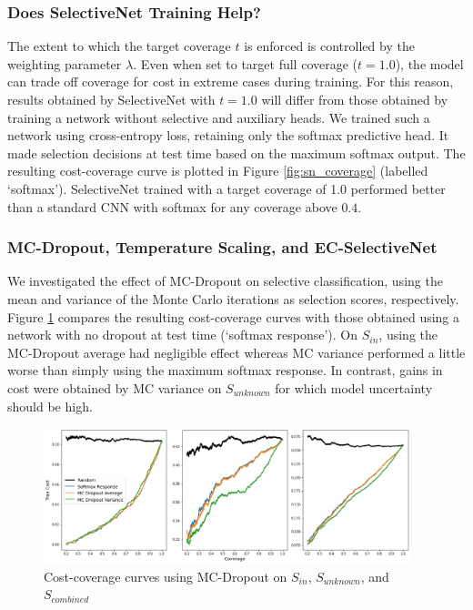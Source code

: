 \subsubsection{Does SelectiveNet Training Help?}
The extent to which the target coverage $t$ is enforced is controlled by the weighting parameter $\lambda$. Even when set to target full coverage ($t=1.0$), the model can trade off coverage for cost in extreme cases during training. For this reason, results obtained by SelectiveNet with $t=1.0$ will differ from those obtained by training a network without selective and auxiliary heads. We trained such a network using cross-entropy loss, retaining only the softmax predictive head. It made selection decisions at test time based on the maximum softmax output. The resulting cost-coverage curve is plotted in Figure \ref{fig:sn_coverage} (labelled `softmax'). SelectiveNet trained with a target coverage of 1.0 performed better than a standard CNN with softmax for any coverage above $0.4$.

\subsubsection{MC-Dropout, Temperature Scaling, and EC-SelectiveNet}
We investigated the effect of MC-Dropout on selective classification, using the mean and variance of the Monte Carlo iterations as selection scores, respectively. Figure \ref{fig:mc_dropout} compares the resulting cost-coverage curves with those obtained using a network with no dropout at test time (`softmax response'). On $S_{in}$, using the MC-Dropout average had negligible effect whereas MC variance performed a little worse than simply using the maximum softmax response. In contrast, gains in cost were obtained by MC variance on $S_{unknown}$ for which model uncertainty should be high.
   
\begin{figure}[h]
	\centering
	\includegraphics[width=0.95\textwidth]{images/mc_dropout_v2.png}
	\caption{Cost-coverage curves using MC-Dropout on $S_{in}$, $S_{unknown}$, and $S_{combined}$}
	\label{fig:mc_dropout}
\end{figure}
   
